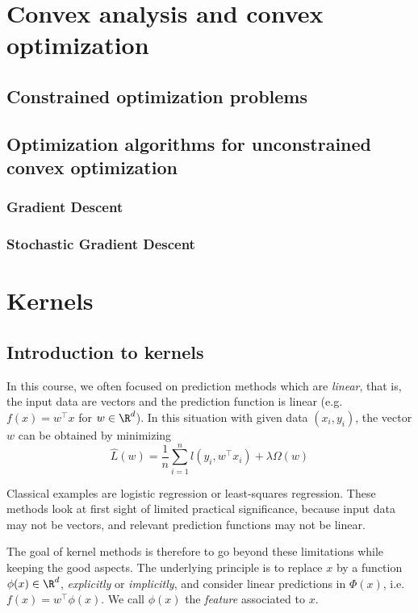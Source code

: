 \documentclass[toc]{../cs-classes/cs-classes}
\begin{document}
\section{Convex analysis and convex optimization}
\subsection{Constrained optimization problems}

\subsection{Optimization algorithms for unconstrained convex optimization}
\subsubsection{Gradient Descent}

\subsubsection{Stochastic Gradient Descent}

\section{Kernels}
\subsection{Introduction to kernels}
In this course, we often focused on prediction methods which are \emph{linear}, that is, the input data are vectors and the prediction function is linear (e.g. $f(x)=w^\top x$ for $w\in\R^d$). In this situation with given data $(x_i, y_i)$, the vector $w$ can be obtained by minimizing
\begin{equation*}
    \hat{L}(w)=\frac{1}{n}\sum_{i=1}^n l(y_i, w^\top x_i) + \lambda \Omega(w)
\end{equation*}

Classical examples are logistic regression or least-squares regression. These methods look at first sight of limited practical significance, because input data may not be vectors, and relevant prediction functions may not be linear.

The goal of kernel methods is therefore to go beyond these limitations while keeping the good aspects. The underlying principle is to replace $x$ by a function $\phi(x)\in\R^d$, \emph{explicitly} or \emph{implicitly}, and consider linear predictions in $\Phi(x)$, i.e. $f(x)=w^\top \phi(x)$. We call $\phi(x)$ the \emph{feature} associated to $x$.
\end{document}
